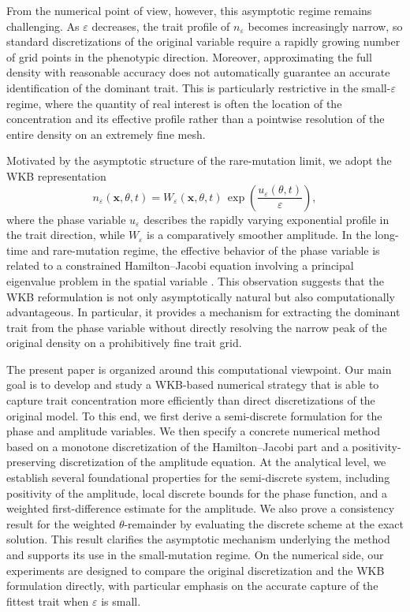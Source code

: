 \documentclass[11pt, dina4, amsfont12]{article}
\begin{document}
From the numerical point of view, however, this asymptotic regime remains challenging. As $\varepsilon$ decreases, the trait profile of $n_\varepsilon$ becomes increasingly narrow, so standard discretizations of the original variable require a rapidly growing number of grid points in the phenotypic direction. Moreover, approximating the full density with reasonable accuracy does not automatically guarantee an accurate identification of the dominant trait. This is particularly restrictive in the small-$\varepsilon$ regime, where the quantity of real interest is often the location of the concentration and its effective profile rather than a pointwise resolution of the entire density on an extremely fine mesh.

Motivated by the asymptotic structure of the rare-mutation limit, we adopt the WKB representation
\[
n_\varepsilon(\mathbf{x},\theta,t)
=
W_\varepsilon(\mathbf{x},\theta,t)\,
\exp\!\left(\frac{u_\varepsilon(\theta,t)}{\varepsilon}\right),
\]
where the phase variable $u_\varepsilon$ describes the rapidly varying exponential profile in the trait direction, while $W_\varepsilon$ is a comparatively smoother amplitude. In the long-time and rare-mutation regime, the effective behavior of the phase variable is related to a constrained Hamilton--Jacobi equation involving a principal eigenvalue problem in the spatial variable \cite{PerthameSouganidis,AlmeidaPerthameRuan}. This observation suggests that the WKB reformulation is not only asymptotically natural but also computationally advantageous. In particular, it provides a mechanism for extracting the dominant trait from the phase variable without directly resolving the narrow peak of the original density on a prohibitively fine trait grid.

The present paper is organized around this computational viewpoint. Our main goal is to develop and study a WKB-based numerical strategy that is able to capture trait concentration more efficiently than direct discretizations of the original model. To this end, we first derive a semi-discrete formulation for the phase and amplitude variables. We then specify a concrete numerical method based on a monotone discretization of the Hamilton--Jacobi part and a positivity-preserving discretization of the amplitude equation. At the analytical level, we establish several foundational properties for the semi-discrete system, including positivity of the amplitude, local discrete bounds for the phase function, and a weighted first-difference estimate for the amplitude. We also prove a consistency result for the weighted $\theta$-remainder by evaluating the discrete scheme at the exact solution. This result clarifies the asymptotic mechanism underlying the method and supports its use in the small-mutation regime. On the numerical side, our experiments are designed to compare the original discretization and the WKB formulation directly, with particular emphasis on the accurate capture of the fittest trait when $\varepsilon$ is small.
\end{document}
